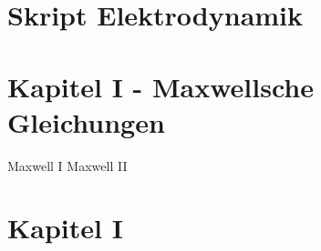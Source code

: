 \documentclass{article}
\begin{document}
\section*{Skript Elektrodynamik}



\section{Kapitel I - Maxwellsche Gleichungen}
Maxwell I
Maxwell II
\section{Kapitel I}
\end{document}
